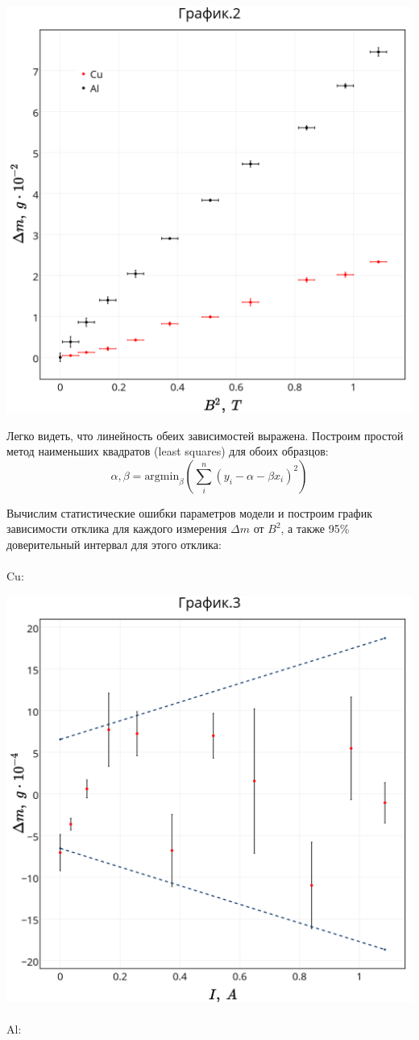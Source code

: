 \includegraphics[scale = 0.19]{my_plot2.png} 

Легко видеть, что линейность обеих зависимостей выражена. Построим простой метод наименьших квадратов (least squares) для обоих образцов:
$$ \alpha, \beta = \text{argmin}_{\beta}(\sum_i^n (y_i - \alpha - \beta x_i)^2) $$

Вычислим статистические ошибки параметров модели и построим график зависимости отклика для каждого измерения $\Delta{m}$ от $B^2$, а также 95\% доверительный интервал для этого отклика:\\
\\
Cu:

\includegraphics[scale = 0.19]{my_plot3.png}\\
\\
Al:

